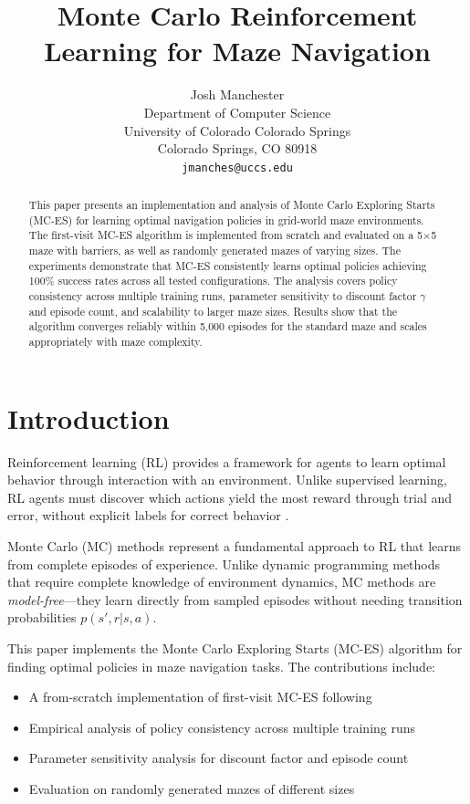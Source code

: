 \documentclass[letterpaper]{article}
\title{Monte Carlo Reinforcement Learning for Maze Navigation}
\author{
    Josh Manchester\\
    Department of Computer Science\\
    University of Colorado Colorado Springs\\
    Colorado Springs, CO 80918\\
    \texttt{jmanches@uccs.edu}
}
\begin{document}
\maketitle

\begin{abstract}
This paper presents an implementation and analysis of Monte Carlo Exploring Starts (MC-ES) for learning optimal navigation policies in grid-world maze environments. The first-visit MC-ES algorithm is implemented from scratch and evaluated on a 5$\times$5 maze with barriers, as well as randomly generated mazes of varying sizes. The experiments demonstrate that MC-ES consistently learns optimal policies achieving 100\% success rates across all tested configurations. The analysis covers policy consistency across multiple training runs, parameter sensitivity to discount factor $\gamma$ and episode count, and scalability to larger maze sizes. Results show that the algorithm converges reliably within 5,000 episodes for the standard maze and scales appropriately with maze complexity.
\end{abstract}

\section{Introduction}

Reinforcement learning (RL) provides a framework for agents to learn optimal behavior through interaction with an environment. Unlike supervised learning, RL agents must discover which actions yield the most reward through trial and error, without explicit labels for correct behavior \citep{sutton2018reinforcement}.

Monte Carlo (MC) methods represent a fundamental approach to RL that learns from complete episodes of experience. Unlike dynamic programming methods that require complete knowledge of environment dynamics, MC methods are \textit{model-free}---they learn directly from sampled episodes without needing transition probabilities $p(s', r | s, a)$.

This paper implements the Monte Carlo Exploring Starts (MC-ES) algorithm for finding optimal policies in maze navigation tasks. The contributions include:

\begin{itemize}
    \item A from-scratch implementation of first-visit MC-ES following \citet{sutton2018reinforcement}
    \item Empirical analysis of policy consistency across multiple training runs
    \item Parameter sensitivity analysis for discount factor and episode count
    \item Evaluation on randomly generated mazes of different sizes
\end{itemize}
\end{document}
